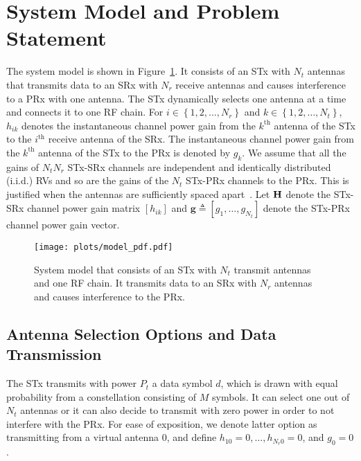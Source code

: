 \documentclass[12pt,draftcls,peerreview,onecolumn]{IEEEtran}
\newcommand{\define}{\triangleq}
\newcommand{\mtx}[1]{{\bf #1}} %
\newcommand{\nx}{{0}}
\newcommand{\Nt}{{N_t}}
\newcommand{\Nr}{{N_r}}
\newcommand{\Pt}{{P_t}}
\newcommand{\such}{h}
\newcommand{\puch}{g}
\newcommand{\hk}[1]{{\such_{#1}}}
\newcommand{\gk}[1]{{\puch_{#1}}}
\newcommand{\g}{\mathbf{\puch}}
\newcommand{\antopts}{\left\{1,2,\ldots,\Nt\right\}}
\newcommand{\nropts}{\left\{1,2,\ldots,\Nr\right\}}
\newcommand{\Hmx}{\mtx{H}}
\newcommand{\ith}{i^{\text{th}}}
\newcommand{\kth}{k^{\text{th}}}
\begin{document}
\section{System Model and Problem Statement}
\label{sec:model}
The system model is shown in Figure~\ref{fig:MODEL}. It consists of an STx with $\Nt$ antennas that transmits data to an SRx with $\Nr$ receive antennas and causes interference to a PRx with one antenna. The STx dynamically selects one antenna at a time and connects it to one RF chain. For $i \in \nropts$ and $k \in \antopts$, $\hk{ik}$ denotes the instantaneous channel power gain from the $\kth$ antenna of the STx to the $\ith$ receive antenna of the SRx. The instantaneous channel power gain from the $\kth$ antenna of the STx to the PRx is denoted by $\gk{k}$. We assume that all the gains of $\Nt\Nr$ STx-SRx channels are independent and identically distributed (i.i.d.) RVs and so are the gains of the $\Nt$ STx-PRx channels to the PRx. This is justified when the antennas are sufficiently spaced apart~\cite{Fakhan_2014_TSP,Kong_2011_JCN,Sarvendranath_2013_TCOM,Hanif_2015_globecom}. Let $\Hmx$ denote the STx-SRx channel power gain matrix $\left[\hk{ik}\right]$ and $\g\define\left[\gk{1},\ldots,\gk{\Nt}\right]$ denote the STx-PRx channel power gain vector.

\begin{figure}
\centering 
\texttt{[image: plots/model\_pdf.pdf]}
\caption{System model that consists of an STx with $\Nt$ transmit antennas and one RF chain. It transmits data to an SRx with $\Nr$ antennas and causes interference to the PRx.}
\label{fig:MODEL}
\end{figure}

\newcommand{\hs}{\mathbf{\such}_{s}}
\newcommand{\bhk}[1]{\mathbf{\such}_{#1}}
\newcommand{\hsstar}{\mathbf{\such}_{s^{*}}}
\newcommand{\datasymbol}{d}

\subsection{Antenna Selection Options and Data Transmission}
The STx transmits with power $\Pt$ a data symbol $\datasymbol$, which is drawn with equal probability from a constellation consisting of $M$ symbols. It can select one out of $\Nt$ antennas or it can also decide to transmit with zero power in order to not interfere with the PRx. For ease of exposition, we denote latter option as transmitting from a virtual antenna $\nx$, and define $\hk{1\nx} = 0,\ldots,\hk{\Nr\nx} = 0$, and $\gk{\nx}= 0$. 
\end{document}
